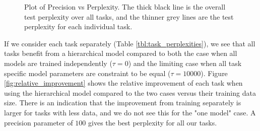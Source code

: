 \documentclass[fullpaper]{nldl}
\begin{document}
\begin{figure}[ht]
    \caption{Plot of Precision vs Perplexity. The thick black line is the overall test perplexity over all tasks, and the thinner grey lines are the test perplexity for each individual task.}
    \label{fig:results_plot}
\end{figure}

If we consider each task separately (Table \ref{tbl:task_perplexities}), we see that all tasks benefit from a hierarchical model compared to both the case when all models are trained independently ($\tau = 0$) and the limiting case when all task specific model parameters are constraint to be equal ($\tau=10000$).
Figure \ref{fig:relative_improvement} shows the relative improvement of each task when using the hierarchical model compared to the two cases versus their training data size. There is an indication that the improvement from training separately is larger for tasks with less data, and we do not see this for the "one model" case.
A precision parameter of $100$ gives the best perplexity for all our tasks.
\end{document}
